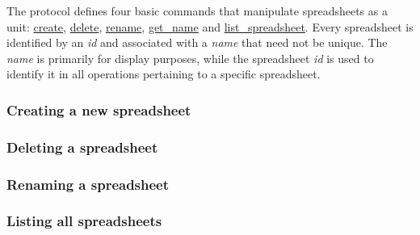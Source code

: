 The protocol defines four basic commands that manipulate spreadsheets as 
a unit: \hyperref[sec:message:create]{create}, \hyperref[sec:message:delete]{delete}, 
\hyperref[sec:message:rename]{rename}, \hyperref[sec:message:get_name]{get\_name} and 
\hyperref[sec:message:list]{list\_spreadsheet}. 
Every spreadsheet is identified by an \emph{id} and associated with a \emph{name} that 
need not be unique. The \emph{name} is primarily for display purposes, while the 
spreadsheet \emph{id} is used to identify it in all operations pertaining to a 
specific spreadsheet.

\subsubsection{Creating a new spreadsheet}


\subsubsection{Deleting a spreadsheet}


\subsubsection{Renaming a spreadsheet}


\subsubsection{Listing all spreadsheets}

